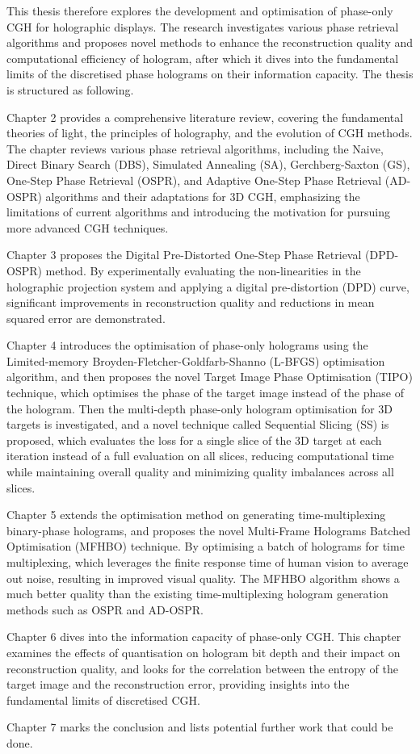 This thesis therefore explores the development and optimisation of phase-only CGH for holographic displays. The research investigates various phase retrieval algorithms and proposes novel methods to enhance the reconstruction quality and computational efficiency of hologram, after which it dives into the fundamental limits of the discretised phase holograms on their information capacity. The thesis is structured as following.

Chapter 2 provides a comprehensive literature review, covering the fundamental theories of light, the principles of holography, and the evolution of CGH methods. The chapter reviews various phase retrieval algorithms, including the Naive, Direct Binary Search (DBS), Simulated Annealing (SA), Gerchberg-Saxton (GS), One-Step Phase Retrieval (OSPR), and Adaptive One-Step Phase Retrieval (AD-OSPR) algorithms and their adaptations for 3D CGH, emphasizing the limitations of current algorithms and introducing the motivation for pursuing more advanced CGH techniques.

Chapter 3 proposes the Digital Pre-Distorted One-Step Phase Retrieval (DPD-OSPR) method. By experimentally evaluating the non-linearities in the holographic projection system and applying a digital pre-distortion (DPD) curve, significant improvements in reconstruction quality and reductions in mean squared error are demonstrated.

Chapter 4 introduces the optimisation of phase-only holograms using the Limited-memory Broyden-Fletcher-Goldfarb-Shanno (L-BFGS) optimisation algorithm, and then proposes the novel Target Image Phase Optimisation (TIPO) technique, which optimises the phase of the target image instead of the phase of the hologram. Then the multi-depth phase-only hologram optimisation for 3D targets is investigated, and a novel technique called Sequential Slicing (SS) is proposed, which evaluates the loss for a single slice of the 3D target at each iteration instead of a full evaluation on all slices, reducing computational time while maintaining overall quality and minimizing quality imbalances across all slices.

Chapter 5 extends the optimisation method on generating time-multiplexing binary-phase holograms, and proposes the novel Multi-Frame Holograms Batched Optimisation (MFHBO) technique. By optimising a batch of holograms for time multiplexing, which leverages the finite response time of human vision to average out noise, resulting in improved visual quality. The MFHBO algorithm shows a much better quality than the existing time-multiplexing hologram generation methods such as OSPR and AD-OSPR.

Chapter 6 dives into the information capacity of phase-only CGH. This chapter examines the effects of quantisation on hologram bit depth and their impact on reconstruction quality, and looks for the correlation between the entropy of the target image and the reconstruction error, providing insights into the fundamental limits of discretised CGH.

Chapter 7 marks the conclusion and lists potential further work that could be done.
